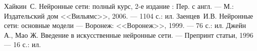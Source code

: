 \renewcommand\refname{\centering Список использованных источников}

\begin{thebibliography}{99}
Хайкин~С. Нейронные сети: полный курс, 2-е издание : Пер. с англ. --- 
М.: Издательский дом <<Вильямс>>, 2006. --- 1104 с.: ил.
Заенцев~И.В. Нейронные сети: основные модели --- 
Воронеж: <<Воронеж>>, 1999. --- 76 с.: ил.
Джейн А., Мао Ж. Введение в искусственные нейронные сети. --- 
Препринт статьи, 1996 ---  16 с.: ил.
\end{thebibliography}